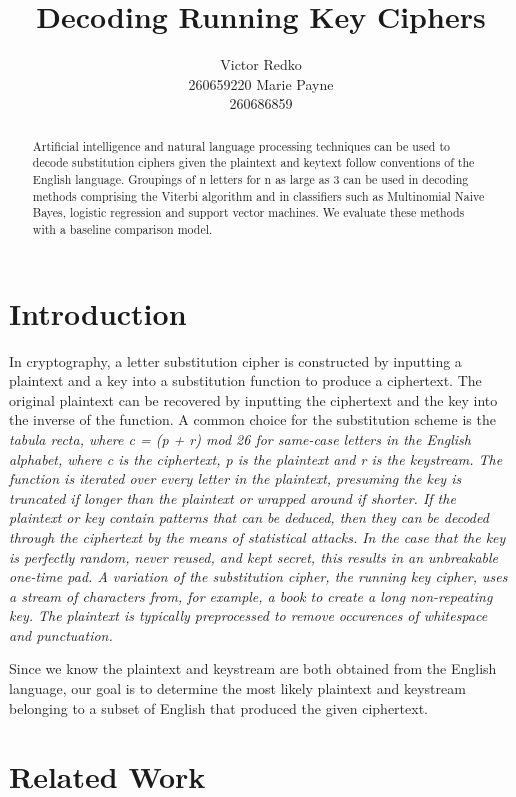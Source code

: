 \documentclass[11pt,letterpaper]{article}
\title{Decoding Running Key Ciphers}
\author{Victor Redko\\
	    260659220
	  \And
	Marie Payne\\
  	260686859}
\date{}
\begin{document}
\maketitle

\begin{abstract}
 
 Artificial intelligence and natural language processing techniques can be used to decode substitution ciphers given the plaintext and keytext follow conventions of the English language. Groupings of n letters for n as large as 3 can be used in decoding methods comprising the Viterbi algorithm and in classifiers such as Multinomial Naive Bayes, logistic regression and support vector machines. We evaluate these methods with a baseline comparison model.
 
\end{abstract}

\section{Introduction}

In cryptography, a letter substitution cipher is constructed by inputting a plaintext and a key into a substitution function to produce a ciphertext. The original plaintext can be recovered by inputting the ciphertext and the key into the inverse of the function. A common choice for the substitution scheme is the \em tabula recta, \em where c = (p + r) mod 26 for same-case letters in the English alphabet, where c is the ciphertext, p is the plaintext and r is the keystream. The function is iterated over every letter in the plaintext, presuming the key is truncated if longer than the plaintext or wrapped around if shorter. If the plaintext or key contain patterns that can be deduced, then they can be decoded through the ciphertext by the means of statistical attacks. In the case that the key is perfectly random, never reused, and kept secret, this results in an unbreakable one-time pad. A variation of the substitution cipher, the running key cipher, uses a stream of characters from, for example, a book to create a long non-repeating key. The plaintext is typically preprocessed to remove occurences of whitespace and punctuation.

Since we know the plaintext and keystream are both obtained from the English language, our goal is to determine the most likely plaintext and keystream belonging to a subset of English that produced the given ciphertext. 

\section{Related Work}
\end{document}
